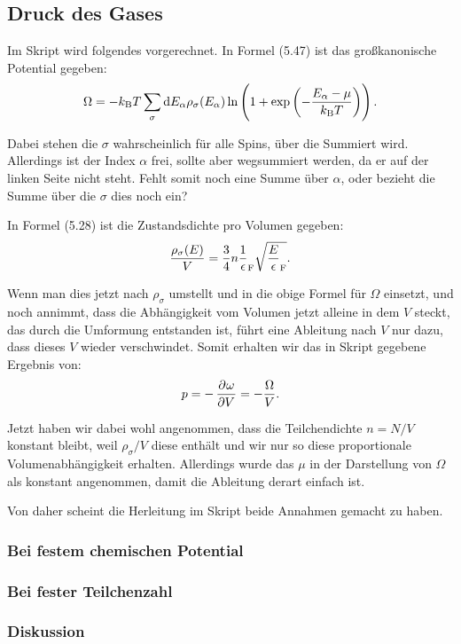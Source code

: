 \subsection{Druck des Gases}

Im Skript wird folgendes vorgerechnet. In Formel (5.47) ist das großkanonische Potential gegeben:
\[
    \Omega = - \kB T \sum_\sigma \dif E_\alpha \rho_\sigma(E_\alpha) \ln\del{1 + \exp\del{- \frac{E_\alpha - \mu}{\kB T}}}.
\]

Dabei stehen die $\sigma$ wahrscheinlich für alle Spins, über die Summiert wird. Allerdings ist der Index $\alpha$ frei, sollte aber wegsummiert werden, da er auf der linken Seite nicht steht. Fehlt somit noch eine Summe über $\alpha$, oder bezieht die Summe über die $\sigma$ dies noch ein?

\newcommand\EF{\epsilon_\text F}

In Formel (5.28) ist die Zustandsdichte pro Volumen gegeben:
\[
    \frac{\rho_\sigma(E)} V = \frac 34 n \frac1\EF \sqrt{\frac E\EF}.
\]

Wenn man dies jetzt nach $\rho_\sigma$ umstellt und in die obige Formel für $\Omega$ einsetzt, und noch annimmt, dass die Abhängigkeit vom Volumen jetzt alleine in dem $V$ steckt, das durch die Umformung entstanden ist, führt eine Ableitung nach $V$ nur dazu, dass dieses $V$ wieder verschwindet. Somit erhalten wir das in Skript gegebene Ergebnis von:
\[
    p = - \dpd \omega V = - \frac \Omega V.
\]

Jetzt haben wir dabei wohl angenommen, dass die Teilchendichte $n = N/V$ konstant bleibt, weil $\rho_\sigma/V$ diese enthält und wir nur so diese proportionale Volumenabhängigkeit erhalten. Allerdings wurde das $\mu$ in der Darstellung von $\Omega$ als konstant angenommen, damit die Ableitung derart einfach ist.

Von daher scheint die Herleitung im Skript beide Annahmen gemacht zu haben.

\subsubsection{Bei festem chemischen Potential}

\fehlt

\subsubsection{Bei fester Teilchenzahl}

\fehlt

\subsubsection{Diskussion}

